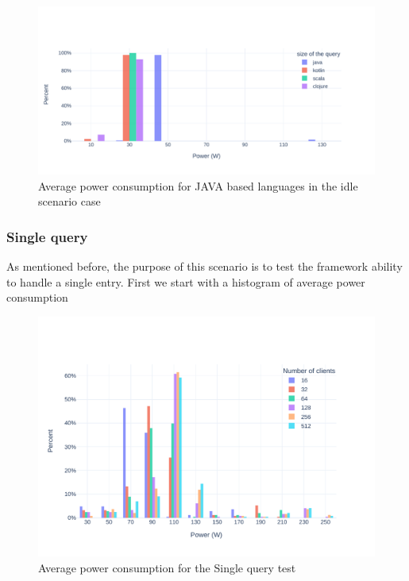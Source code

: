 \begin{figure}[bht]
    \centering
    \label{fig:av_power_java_idle}
    \includegraphics[width=1.0\columnwidth]{imgs/av_power_java_idle}
    \caption{Average power consumption for  JAVA based languages in the idle scenario case}
\end{figure}


\subsubsection{Single query}
As mentioned before, the purpose of this scenario is to test the framework ability to handle a single entry.
First we start with a histogram of average power consumption
\begin{figure}[bht]
    \centering
    \label{fig:av_power_db}
    \includegraphics[width=1.0\columnwidth]{imgs/av_power_db}
    \caption{Average power consumption for the Single query test}
\end{figure}

